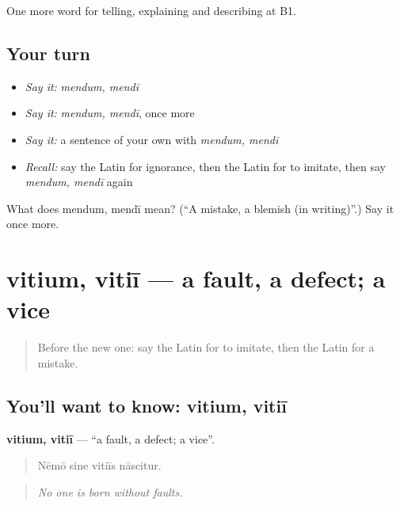 \begin{grammarlens}[title={What you've built}]
One more word for telling, explaining and describing at B1.
\end{grammarlens}

\subsection*{Your turn}
\begin{itemize}
\raggedright
  \item \emph{Say it:} \emph{mendum, mendī}
  \item \emph{Say it:} \emph{mendum, mendī}, once more
  \item \emph{Say it:} a sentence of your own with \emph{mendum, mendī}
  \item \emph{Recall:} say the Latin for ignorance, then the Latin for to imitate, then say \emph{mendum, mendī} again
\end{itemize}

\begin{tcolorbox}[breakable,colback=teal!4,colframe=teal!35!black,title={Before you move on}]
What does mendum, mendī mean? (\textquotedblleft{}A mistake, a blemish (in writing)\textquotedblright{}.) Say it once more.
\end{tcolorbox}
\section[vitium, vitiī]{vitium, vitiī — a fault, a defect; a vice}

\label{lesson:LA-C408-vitium}



\begin{quote}
Before the new one: say the Latin for to imitate, then the Latin for a mistake.
\end{quote}

\subsection*{You'll want to know: vitium, vitiī}
\textbf{vitium, vitiī} — \textquotedblleft{}a fault, a defect; a vice\textquotedblright{}.

\begin{quote}
Nēmō sine vitiīs nāscitur.
\end{quote}

\begin{quote}
\emph{No one is born without faults.}
\end{quote}

